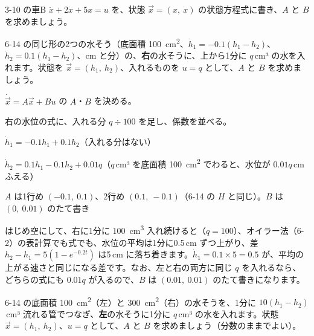 \begin{jibun}
3-10 の車B $\ddot x+2\dot x+5x=u$ を、状態 $\vec x=(x,\ \dot x)$ の状態方程式に書き、$A$ と $B$ を求めましょう。
\end{jibun}

\begin{reidai}[水そうに水を入れる]
6-14 の同じ形の2つの水そう（底面積 \qty{100}{cm^2}、$\dot h_1=-0.1(h_1-h_2)$、$\dot h_2=0.1(h_1-h_2)$、cm と分）の、\textbf{右}の水そうに、上から1分に $q$\,cm³ の水を入れます。状態を $\vec x=(h_1,\ h_2)$、入れるものを $u=q$ として、$A$ と $B$ を求めましょう。\par
\kangaekata {}\par
{}\enspace $\dot{\vec x}=A\vec x+Bu$ の $A$・$B$ を決める。\par
{}\enspace 右の水位の式に、入れる分 $q\div100$ を足し、係数を並べる。\par
\shiki\kixks{}\zw{} $\dot h_1=-0.1h_1+0.1h_2$\quad （入れる分はない）\par
\kixka $\dot h_2=0.1h_1-0.1h_2+0.01q$\quad （$q$\,cm³ を底面積 \qty{100}{cm^2} でわると、水位が $0.01q$\,cm ふえる）\par
\kotae $A$ は1行め $(-0.1,\ 0.1)$、2行め $(0.1,\ -0.1)$（6-14 の $H$ と同じ）。$B$ は $(0,\ 0.01)$ のたて書き
\end{reidai}

はじめ空にして、右に1分に \qty{100}{cm^3} 入れ続けると（$q=100$）、オイラー法（6-2）の表計算でも式でも、水位の平均は1分に0.5\,cm ずつ上がり、差 $h_2-h_1=5(1-e^{-0.2t})$ は5\,cm に落ち着きます。$\dot h_1=0.1\times5=0.5$ が、平均の上がる速さと同じになる差です。なお、左と右の両方に同じ $q$ を入れるなら、どちらの式にも $0.01q$ が入るので、$B$ は $(0.01,\ 0.01)$ のたて書きになります。

\begin{jibun}
6-14 の底面積 \qty{100}{cm^2}（左）と \qty{300}{cm^2}（右）の水そうを、1分に $10(h_1-h_2)$\,cm³ 流れる管でつなぎ、\textbf{左}の水そうに1分に $q$\,cm³ の水を入れます。状態 $\vec x=(h_1,\ h_2)$、$u=q$ として、$A$ と $B$ を求めましょう（分数のままでよい）。
\end{jibun}

